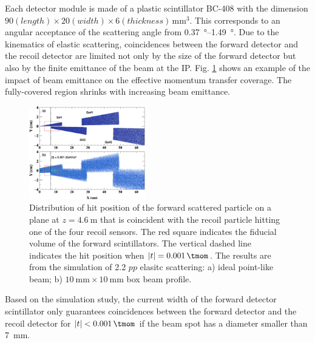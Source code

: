 \documentclass[number,5p]{elsarticle}
\begin{document}
Each detector module is made of a plastic scintillator BC-408 \cite{bc408} with the dimension $90 (length) \times 20 (width) \times 6
(thickness)\,\si{\mm\tothe{3}}$.
This corresponds to an angular acceptance of the scattering angle from \SIrange[range-units=repeat]{0.37}{1.49}{\degree}.
Due to the kinematics of elastic scattering, coincidences between the forward
detector and the recoil detector are limited not only by the size of the forward
detector but also by the finite emittance of the beam at the IP.
Fig. \ref{fig:forward_acceptance} shows an example of the impact of beam emittance on the
effective momentum transfer coverage.
The fully-covered region shrinks with increasing beam emittance. 
\begin{figure}[htb]
  \centering
  \includegraphics[width=0.45\textwidth]{./fwd_acceptance.png}
  \caption{
    Distribution of hit position of the forward scattered particle on a plane at
    $z=\SI{4.6}{\m}$ that is coincident with the recoil particle hitting one of
    the four recoil sensors.
    The red square indicates the fiducial volume of the forward scintillators.
    The vertical dashed line indicates the hit position when $|t| = \SI{0.001}{\tmom}$.
    The results are from the simulation of \SI{2.2}{\momentum}
    $pp$ elasitc scattering: a) ideal point-like beam; b) $\SI{10}{\mm}\times\SI{10}{\mm}$ box beam profile.
    }
  \label{fig:forward_acceptance}
\end{figure}
Based on the simulation study, the current width of the forward detector
scintillator only guarantees coincidences between the forward detector and the
recoil detector for $|t| < \SI{0.001}{\tmom}$ if the beam spot has a diameter smaller than \SI{7}{\mm}.
\end{document}
